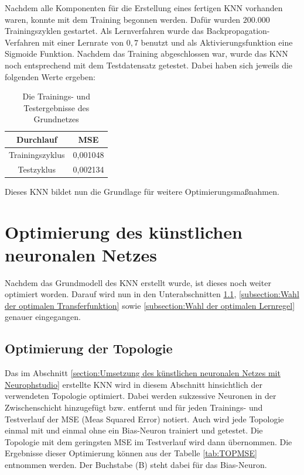 Nachdem alle Komponenten für die Erstellung eines fertigen KNN vorhanden waren, konnte mit dem Training begonnen werden. Dafür wurden $200.000$ Trainingszyklen gestartet. Als Lernverfahren wurde das Backpropagation-Verfahren mit einer Lernrate von $0,7$ benutzt und als Aktivierungsfunktion eine Sigmoide Funktion. Nachdem das Training abgeschlossen war, wurde das KNN noch entsprechend mit dem Testdatensatz getestet. Dabei haben sich jeweils die folgenden Werte ergeben:

\begin{table}[H]
\centering
\begin{tabular}{|c|c|}
\hline 
\textbf{Durchlauf} & \textbf{MSE} \\ 
\hline 
Trainingszyklus & 0,001048 \\ 
\hline  
Testzyklus & 0,002134  \\ 
\hline 
\end{tabular} 
\label{tab:ERGGrundnetz}
\caption{Die Trainings- und Testergebnisse des Grundnetzes}
\end{table}

Dieses KNN bildet nun die Grundlage für weitere Optimierungsmaßnahmen.

\section{Optimierung des künstlichen neuronalen Netzes}
\label{section:Optimierung des künstlischen neuronalen Netzes}

Nachdem das Grundmodell des KNN erstellt wurde, ist dieses noch weiter optimiert worden. Darauf wird nun in den Unterabschnitten \ref{subsection:Optimierung der Topologie}, \ref{subsection:Wahl der optimalen Transferfunktion} sowie \ref{subsection:Wahl der optimalen Lernregel} genauer eingegangen. 

\subsection{Optimierung der Topologie}
\label{subsection:Optimierung der Topologie}

Das im Abschnitt \ref{section:Umsetzung des künstlichen neuronalen Netzes mit Neurophstudio} erstellte KNN wird in diesem Abschnitt hinsichtlich der verwendeten Topologie optimiert. Dabei werden sukzessive Neuronen in der Zwischenschicht hinzugefügt bzw. entfernt und für jeden Trainings- und Testverlauf der MSE (Meas Squared Error) notiert. Auch wird jede Topologie einmal mit und einmal ohne ein Bias-Neuron trainiert und getestet. Die Topologie mit dem geringsten MSE im Testverlauf wird dann übernommen. Die Ergebnisse dieser Optimierung können aus der Tabelle \ref{tab:TOPMSE} entnommen werden. Der Buchstabe (B) steht dabei für das Bias-Neuron.

